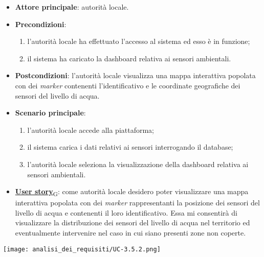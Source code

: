 \begin{itemize}
	\item \textbf{Attore principale}: autorità locale.
	\item \textbf{Precondizioni}:
	      \begin{enumerate}
		      \item l'autorità locale ha effettuato l'accesso al sistema ed esso è in funzione;
		      \item il sistema ha caricato la dashboard relativa ai sensori ambientali.
	      \end{enumerate}
	\item \textbf{Postcondizioni}: l'autorità locale visualizza una mappa interattiva popolata con dei \textit{marker} contenenti l'identificativo e le coordinate geografiche dei sensori del livello di acqua.
	\item \textbf{Scenario principale}:
	      \begin{enumerate}
		      \item l'autorità locale accede alla piattaforma;
		      \item il sistema carica i dati relativi ai sensori interrogando il database;
		      \item l'autorità locale seleziona la visualizzazione della dashboard relativa ai sensori ambientali.
	      \end{enumerate}
	\item \href{https://7last.github.io/docs/pb/documentazione-interna/glossario\#user-story}{\textbf{User story}\textsubscript{G}}:
	      come autorità locale desidero poter visualizzare una mappa interattiva popolata con dei \textit{marker} rappresentanti la posizione dei sensori del livello di acqua
	      e contenenti il loro identificativo. Essa mi consentirà di visualizzare la distribuzione dei sensori del livello di acqua nel territorio ed eventualmente intervenire nel caso in cui siano presenti zone non coperte.
\end{itemize}
\begin{center}
	\texttt{[image: analisi\_dei\_requisiti/UC-3.5.2.png]}
\end{center}

